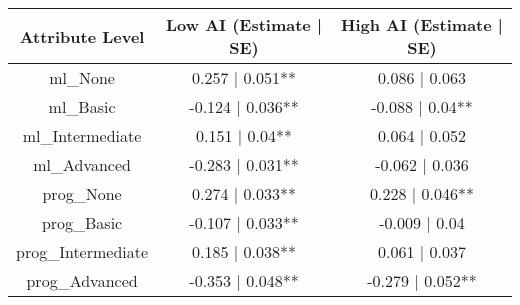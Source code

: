 \begin{table}[t]
\fontsize{12.0pt}{14.4pt}\selectfont
\begin{tabular*}{\linewidth}{@{\extracolsep{\fill}}ccc}
\toprule
Attribute Level & Low AI (Estimate | SE) & High AI (Estimate | SE) \\ 
\midrule\addlinespace[2.5pt]
ml\_None & 0.257 | 0.051** & 0.086 | 0.063 \\ 
ml\_Basic & -0.124 | 0.036** & -0.088 | 0.04** \\ 
ml\_Intermediate & 0.151 | 0.04** & 0.064 | 0.052 \\ 
ml\_Advanced & -0.283 | 0.031** & -0.062 | 0.036 \\ 
prog\_None & 0.274 | 0.033** & 0.228 | 0.046** \\ 
prog\_Basic & -0.107 | 0.033** & -0.009 | 0.04 \\ 
prog\_Intermediate & 0.185 | 0.038** & 0.061 | 0.037 \\ 
prog\_Advanced & -0.353 | 0.048** & -0.279 | 0.052** \\ 
\bottomrule
\end{tabular*}
\end{table}

